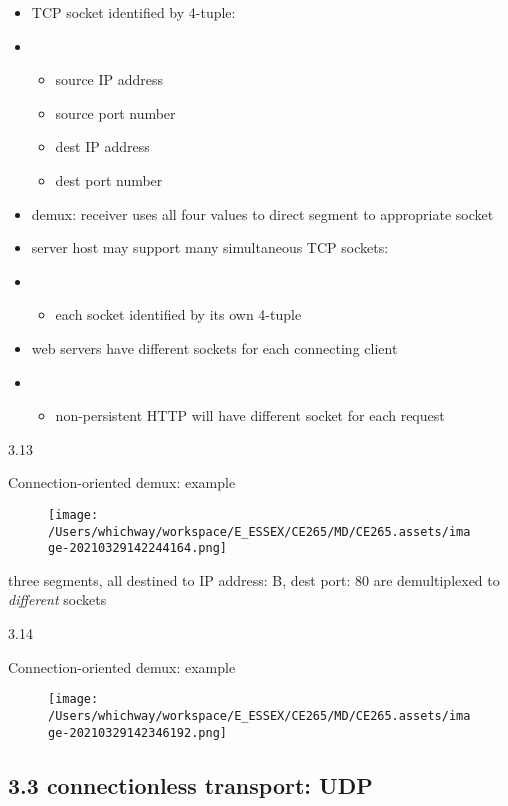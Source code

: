 \documentclass[
]{article}
\begin{document}
\begin{itemize}
\item
  TCP socket identified by 4-tuple:
\item
  \begin{itemize}
  \item
    source IP address
  \item
    source port number
  \item
    dest IP address
  \item
    dest port number
  \end{itemize}
\item
  demux: receiver uses all four values to direct segment to appropriate
  socket
\item
  server host may support many simultaneous TCP sockets:
\item
  \begin{itemize}
  \item
    each socket identified by its own 4-tuple
  \end{itemize}
\item
  web servers have different sockets for each connecting client
\item
  \begin{itemize}
  \item
    non-persistent HTTP will have different socket for each request
  \end{itemize}
\end{itemize}

3.13

Connection-oriented demux: example

\begin{figure}
\centering
\texttt{[image: /Users/whichway/workspace/E\_ESSEX/CE265/MD/CE265.assets/image-20210329142244164.png]}
\caption{}
\end{figure}

three segments, all destined to IP address: B, dest port: 80 are
demultiplexed to \emph{different} sockets

3.14

Connection-oriented demux: example

\begin{figure}
\centering
\texttt{[image: /Users/whichway/workspace/E\_ESSEX/CE265/MD/CE265.assets/image-20210329142346192.png]}
\caption{}
\end{figure}

\hypertarget{33-connectionless-transport-udp}{%
\subsection{3.3 connectionless transport:
UDP}\label{33-connectionless-transport-udp}}
\end{document}

